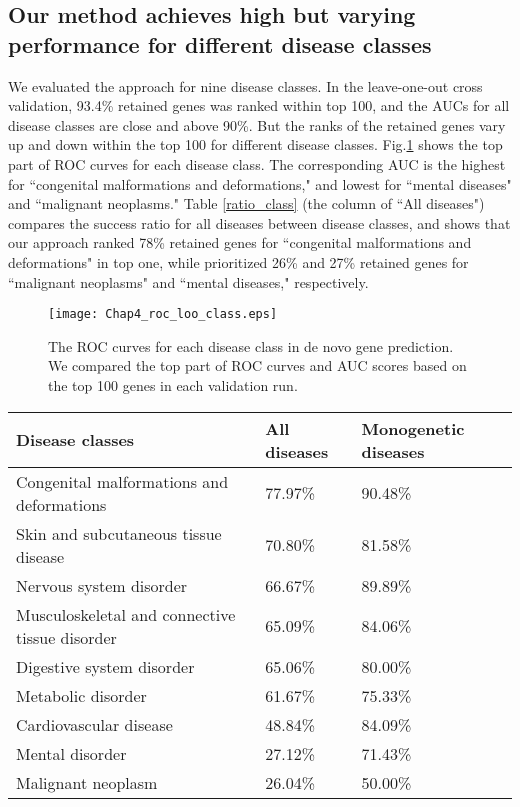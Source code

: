 \subsection{Our method achieves high but varying performance for different disease classes}
We evaluated the approach for nine disease classes.
In the leave-one-out cross validation,
93.4\% retained genes was ranked within top 100,
and the AUCs for all disease classes are close and above 90\%.
But the ranks of the retained genes vary up and down within
the top 100 for different disease classes.
Fig.\ref{roc_loo_class} shows the top part of ROC
curves for each disease class. The corresponding AUC
is the highest for ``congenital malformations and deformations,"
and lowest for ``mental diseases" and ``malignant neoplasms."
Table \ref{ratio_class} (the column of ``All diseases")
compares the success ratio for all diseases between disease classes,
and shows that our approach ranked
78\% retained genes for ``congenital malformations and deformations"
in top one, while prioritized 26\% and 27\% retained genes for
``malignant neoplasms" and ``mental diseases," respectively.
\begin{figure}[!t]
\centering
\texttt{[image: Chap4\_roc\_loo\_class.eps]}
\caption{The ROC curves for each disease class in de novo gene prediction. We compared the top part of ROC curves and AUC scores based on the top 100 genes in each validation run.}
\vspace{-.4cm}
\label{roc_loo_class}
\end{figure}

\begin{table*}[!t]
\caption{Success ratio of disease-gene association predictions for all diseases and monogenetic diseases in the nine disease classes.}
\label{ratio_class}
\centering
\begin{tabular}{lll}
\hline
Disease classes & All diseases & Monogenetic diseases\\\hline
Congenital malformations and deformations &	77.97\%	&90.48\%\\\hline
Skin and subcutaneous tissue disease	&70.80\% &	81.58\%\\\hline
Nervous system disorder	&66.67\%	&89.89\%\\\hline
Musculoskeletal and connective tissue disorder&	65.09\%	&84.06\%\\\hline
Digestive system disorder	&65.06\%	&80.00\%\\\hline
Metabolic disorder	&61.67\%	&75.33\%\\\hline
Cardiovascular disease	&48.84\%	&84.09\%\\\hline
Mental disorder	&27.12\%	&71.43\%\\\hline
Malignant neoplasm	&26.04\%	&50.00\%\\\hline

\end{tabular}
\end{table*}

